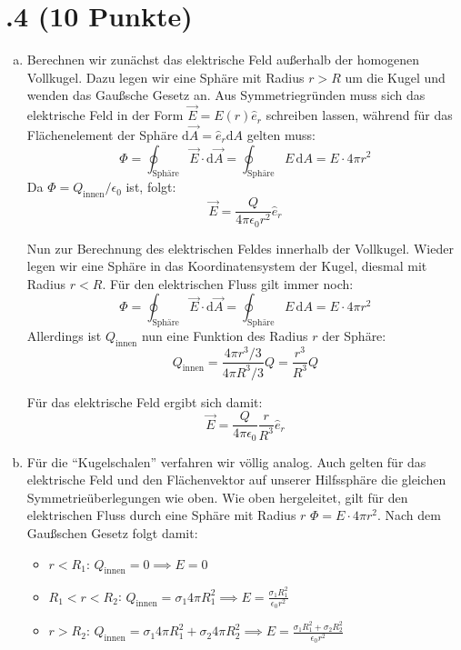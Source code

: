 \section*{\nr.4 \titfour (10 Punkte)}
\begin{enumerate}[(a)]
\item Berechnen wir zunächst das elektrische Feld außerhalb der homogenen Vollkugel. Dazu legen wir eine Sphäre mit Radius $r>R$ um die Kugel und wenden das Gaußsche Gesetz an. Aus Symmetriegründen muss sich das elektrische Feld in der Form $\vec{E}=E(r)\hat{e}_r$ schreiben lassen, während für das Flächenelement der Sphäre $\mathrm{d}\vec{A}=\hat{e}_r \mathrm{d}A$ gelten muss:
\begin{equation}
\Phi = \oint_{\text{Sphäre}}\vec{E}\cdot\mathrm{d}\vec{A}= \oint_{\text{Sphäre}}E\, \mathrm{d}A = E\cdot 4\pi r^2
\end{equation}
Da $\Phi= Q_\text{innen}/\epsilon_0$ ist, folgt:
\begin{equation}
\vec{E}=\frac{Q}{4\pi\epsilon_0r^2}\hat{e}_r
\end{equation}

Nun zur Berechnung des elektrischen Feldes innerhalb der Vollkugel. Wieder legen wir eine Sphäre in das Koordinatensystem der Kugel, diesmal mit Radius $r<R$. Für den elektrischen Fluss gilt immer noch:
\begin{equation}
\Phi = \oint_{\text{Sphäre}}\vec{E}\cdot\mathrm{d}\vec{A}= \oint_{\text{Sphäre}}E\, \mathrm{d}A = E\cdot 4\pi r^2
\end{equation}
Allerdings ist  $Q_\text{innen}$ nun eine Funktion des Radius $r$ der Sphäre:
\begin{equation}
Q_\text{innen} = \frac{4\pi r^3 /3}{4\pi R^3/3} Q= \frac{r^3}{R^3}Q
\end{equation} 

Für das elektrische Feld ergibt sich damit:
\begin{equation}
\vec{E}=\frac{Q}{4\pi\epsilon_0}\frac{r}{R^3}\hat{e}_r
\end{equation}

\item Für die "`Kugelschalen"' verfahren wir völlig analog. Auch gelten für das elektrische Feld und den Flächenvektor auf unserer Hilfssphäre die gleichen Symmetrieüberlegungen wie oben. Wie oben hergeleitet, gilt für den elektrischen Fluss durch eine Sphäre mit Radius $r$ $\Phi= E\cdot 4\pi r^2$. Nach dem Gaußschen Gesetz folgt damit:
\begin{itemize}
\item $r<R_1$: $Q_\text{innen}=0 \implies E=0$
\item $R_1<r<R_2$: $Q_\text{innen}=\sigma_1 4\pi R_1^2 \implies E =\frac{\sigma_1 R_1^2}{\epsilon_0 r^2}$
\item $r>R_2$: $Q_\text{innen}=\sigma_1 4\pi R_1^2 + \sigma_2 4\pi R_2^2 \implies E =\frac{\sigma_1 R_1^2+\sigma_2 R_2^2}{\epsilon_0 r^2}$
\end{itemize}


\end{enumerate}
